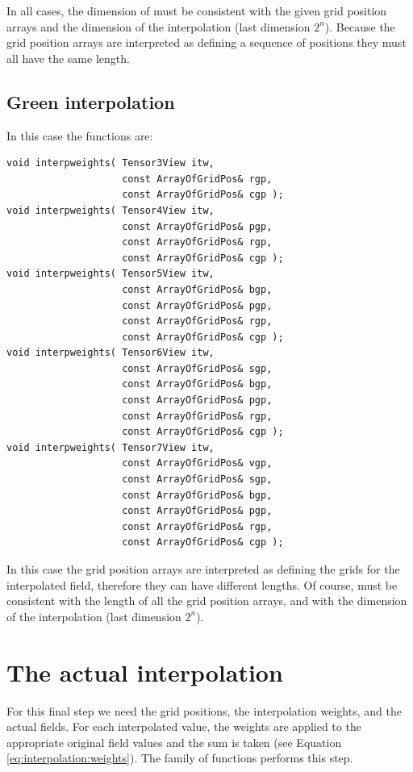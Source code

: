 In all cases, the dimension of  must be consistent with the
given grid position arrays and the dimension of the interpolation
(last dimension $2^n$). Because the grid position arrays are
interpreted as defining a sequence of positions they must all have
the same length.

\subsection{Green interpolation}

In this case the functions are:

\begin{lstlisting}
void interpweights( Tensor3View itw,
                    const ArrayOfGridPos& rgp,
                    const ArrayOfGridPos& cgp );
void interpweights( Tensor4View itw,
                    const ArrayOfGridPos& pgp,
                    const ArrayOfGridPos& rgp,
                    const ArrayOfGridPos& cgp );
void interpweights( Tensor5View itw,
                    const ArrayOfGridPos& bgp,
                    const ArrayOfGridPos& pgp,
                    const ArrayOfGridPos& rgp,
                    const ArrayOfGridPos& cgp );
void interpweights( Tensor6View itw,
                    const ArrayOfGridPos& sgp,
                    const ArrayOfGridPos& bgp,
                    const ArrayOfGridPos& pgp,
                    const ArrayOfGridPos& rgp,
                    const ArrayOfGridPos& cgp );
void interpweights( Tensor7View itw,
                    const ArrayOfGridPos& vgp,
                    const ArrayOfGridPos& sgp,
                    const ArrayOfGridPos& bgp,
                    const ArrayOfGridPos& pgp,
                    const ArrayOfGridPos& rgp,
                    const ArrayOfGridPos& cgp );
\end{lstlisting}

In this case the grid position arrays are interpreted as defining the
grids for the interpolated field, therefore they can have different
lengths. Of course,  must be consistent with the length of
all the grid position arrays, and with the dimension of the
interpolation (last dimension $2^n$).

\section{The actual interpolation}

For this final step we need the grid positions, the
interpolation weights, and the actual fields. For each interpolated
value, the weights are applied to the appropriate original field values
and the sum is taken (see Equation
\ref{eq:interpolation:weights}). The  family of functions
performs this step.

